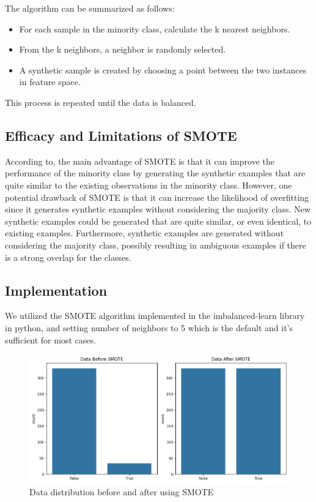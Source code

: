 \documentclass[12pt]{report}
\begin{document}
The algorithm can be summarized as follows:
\begin{itemize}
      \item For each sample in the minority class, calculate the k nearest neighbors.
      \item From the k neighbors, a neighbor is randomly selected.
      \item A synthetic sample is created by choosing a point between the two instances in
            feature space.
\end{itemize}

This process is repeated until the data is balanced.

\subsection*{Efficacy and Limitations of SMOTE}

According to\cite{fernandez2018smote}, the main advantage of SMOTE is that it
can improve the performance of the minority class by generating the synthetic
examples that are quite similar to the existing observations in the minority
class. However, one potential drawback of SMOTE is that it can increase the
likelihood of overfitting since it generates synthetic examples without
considering the majority class. New synthetic examples could be generated that
are quite similar, or even identical, to existing examples. Furthermore,
synthetic examples are generated without considering the majority class,
possibly resulting in ambiguous examples if there is a strong overlap for the
classes.

\subsection*{Implementation}
We utilized the SMOTE algorithm implemented in the imbalanced-learn library in
python, and setting number of neighbors to 5 which is the default and it's
sufficient for most cases.

\begin{figure}[ht]
      \centering
      \includegraphics[width=\textwidth]{./figures/Imbalanced_vs_balanced.png}
      \caption{Data distribution before and after using SMOTE}
      \label{fig:smote_plot}
\end{figure}
\end{document}

